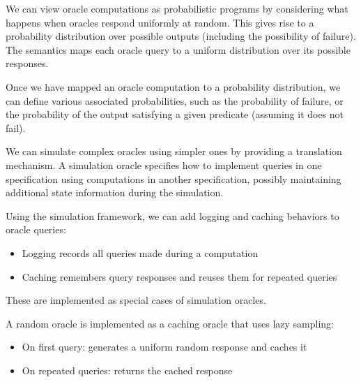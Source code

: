\begin{definition}
    \label{def:probabilistic_semantics_of_oracle_computations}
    We can view oracle computations as probabilistic programs by considering what happens when 
    oracles respond uniformly at random. This gives rise to a probability distribution over possible 
    outputs (including the possibility of failure). The semantics maps each oracle query to a 
    uniform distribution over its possible responses.
\end{definition}

Once we have mapped an oracle computation to a probability distribution, we can define various associated probabilities, such as the probability of failure, or the probability of the output satisfying a given predicate (assuming it does not fail).

\begin{definition}
    \label{def:sim_oracle}
    We can simulate complex oracles using simpler ones by providing a translation mechanism. 
    A simulation oracle specifies how to implement queries in one specification using computations 
    in another specification, possibly maintaining additional state information during the simulation.
\end{definition}

\begin{definition}
    \label{def:logging_caching_oracle_queries}
    Using the simulation framework, we can add logging and caching behaviors to oracle queries:
    \begin{itemize}
        \item Logging records all queries made during a computation
        \item Caching remembers query responses and reuses them for repeated queries
    \end{itemize}
    These are implemented as special cases of simulation oracles.
\end{definition}

\begin{definition}
    \label{def:random_oracle}
    A random oracle is implemented as a caching oracle that uses lazy sampling:
    \begin{itemize}
        \item On first query: generates a uniform random response and caches it
        \item On repeated queries: returns the cached response
    \end{itemize}
\end{definition}

